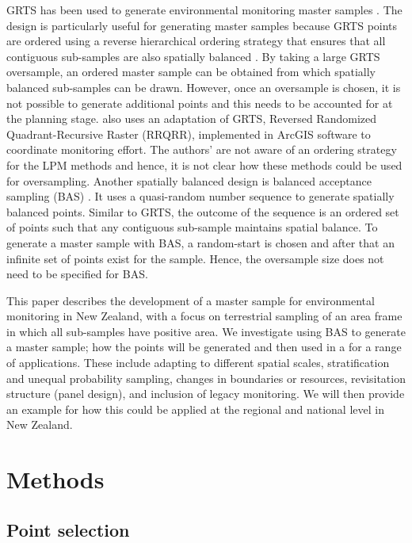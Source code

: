 \documentclass[titlepage]{article}
\begin{document}
GRTS has been used to generate environmental monitoring master samples \citep{LarsenOlsenStevens2008}. The design is particularly useful for generating master samples because GRTS points are ordered using a reverse hierarchical ordering strategy that ensures that all contiguous sub-samples are also spatially balanced \citep{StevensOlsen2004}. By taking a large GRTS oversample, an ordered master sample can be obtained from which spatially balanced sub-samples can be drawn. However, once an oversample is chosen, it is not possible to generate additional points and this needs to be accounted for at the planning stage. \citet{theobald2016} also uses an adaptation of GRTS, Reversed Randomized Quadrant-Recursive
Raster (RRQRR), implemented in ArcGIS software \citep{theobald2007} to coordinate monitoring effort. The authors' are not aware of an ordering strategy for the LPM methods and hence, it is not clear how these methods could be used for oversampling. Another spatially balanced design is balanced acceptance sampling (BAS) \citep{Robertson2013}. It uses a quasi-random number sequence to generate spatially balanced points. Similar to GRTS, the outcome of the sequence is an ordered set of points such that any contiguous sub-sample maintains spatial balance. To generate a master sample with BAS, a random-start is chosen and after that an infinite set of points exist for the sample. Hence, the oversample size does not need to be specified for BAS.

This paper describes the development of a master sample for environmental monitoring in New Zealand, with a focus on terrestrial sampling of an area frame in which all sub-samples have positive area. We investigate using BAS to generate a master sample; how the points will be generated and then used in a for a range of applications. These include adapting to different spatial scales, stratification and unequal probability sampling, changes in boundaries or resources, revisitation structure (panel design), and inclusion of legacy monitoring. We will then provide an example for how this could be applied at the regional and national level in New Zealand.

\section{Methods}
\subsection{Point selection}
\end{document}
